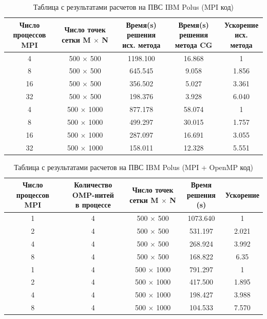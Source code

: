 \documentclass{article}
\begin{document}
\begin{table}[!htp]
\centering
\begin{tabular}{c|c|c|c|c}
\hline
 \makecell[c]{Число процессов \\ MPI} & \makecell[c]{Число точек сетки \\ M $\times$ N }& \makecell[c]{Время(s) решения\\ исх. метода} & \makecell[c]{Время(s) решения \\ метода CG}& \makecell[c]{Ускорение\\исх. метода} \\ \hline
4 & 500 $\times$ 500 & 1198.100 & 16.868 &1 \\
8 & 500 $\times$ 500 & 645.545 & 9.058 &1.856 \\
16 & 500 $\times$ 500 & 356.502 & 5.027 &3.361 \\
32 & 500 $\times$ 500 & 198.376 & 3.928 &6.040 \\ \hline
4 & 500 $\times$ 1000 & 877.178 & 58.074 &1 \\
8 & 500 $\times$ 1000 & 499.297 & 30.015 & 1.757 \\
16 & 500 $\times$ 1000 & 287.097 & 16.691 &3.055 \\
32 & 500 $\times$ 1000 & 158.011 & 12.328 &5.551 \\ 
\end{tabular}
\caption{Таблица с результатами расчетов на ПВС IBM Polus (MPI код)}
\end{table}

\begin{table}[!htp]
\centering
\begin{tabular}{c|c|c|c|c}
\hline
 Число процессов MPI & \makecell[c]{Количество OMP-нитей \\ в процессе} & \makecell[c]{Число точек \\ сетки M $\times$ N} & \makecell[c]{Время \\решения (s)} & Ускорение \\ \hline
1 & 4 & 500 $\times$ 500 & 1073.640 & 1 \\
2 & 4 & 500 $\times$ 500 & 531.197 & 2.021 \\
4 & 4 & 500 $\times$ 500 & 268.924 & 3.992 \\
8 & 4 & 500 $\times$ 500 & 168.822 & 6.35 \\ \hline
1 & 4 & 500 $\times$ 1000 & 791.297 & 1 \\
2 & 4 & 500 $\times$ 1000 & 417.500 & 1.895 \\
4 & 4 & 500 $\times$ 1000 & 198.427 & 3.988 \\
8 & 4 & 500 $\times$ 1000 & 104.533 & 7.570 \\ 
\end{tabular}
\caption{Таблица с результатами расчетов на ПВС IBM Polus (MPI + OpenMP код)}
\end{table}
\end{document}
